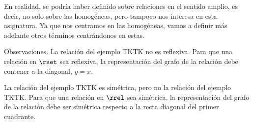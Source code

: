 En realidad, se podría haber definido sobre relaciones en el sentido amplio,
es decir, no solo sobre las homogéneas, pero tampoco nos interesa en esta
asignatura. Ya que nos centramos en las homogéneas, vamos a definir más
adelante otros términos centrándonos en estas.

Observaciones. La relación del ejemplo TKTK no es reflexiva. Para que una
relación en $\rset$ sea reflexiva, la representación del grafo de la
relación debe contener a la diagonal, $y = x$.

La relación del ejemplo TKTK es simétrica, pero no la relación del ejemplo
TKTK. Para que una relación en $\rrel$ sea simétrica, la representación del
grafo de la relación debe ser simétrica respecto a la recta diagonal del
primer cuadrante.












